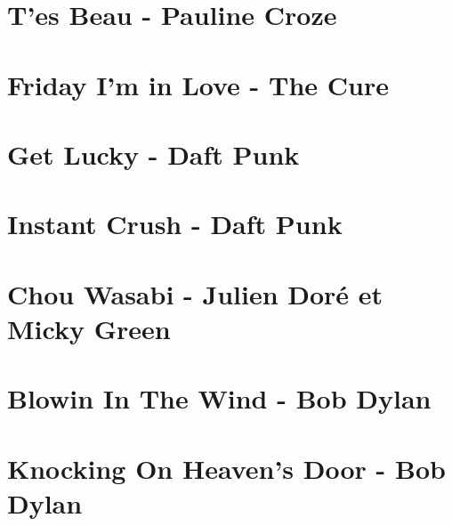 \documentclass{guitartabs}
\begin{document}
\section{T'es Beau - Pauline Croze}
\begin{guitar}

\end{guitar}


\section{Friday I'm in Love - The Cure}
\begin{guitar}

\end{guitar}


\section{Get Lucky - Daft Punk}
\begin{guitar}

\end{guitar}


\section{Instant Crush - Daft Punk}
\begin{guitar}

\end{guitar}



\section{Chou Wasabi - Julien Doré et Micky Green}
\begin{guitar}

\end{guitar}


\section{Blowin In The Wind - Bob Dylan}
\begin{guitar}

\end{guitar}



\section{Knocking On Heaven's Door - Bob Dylan}
\begin{guitar}

\end{guitar}
\end{document}
